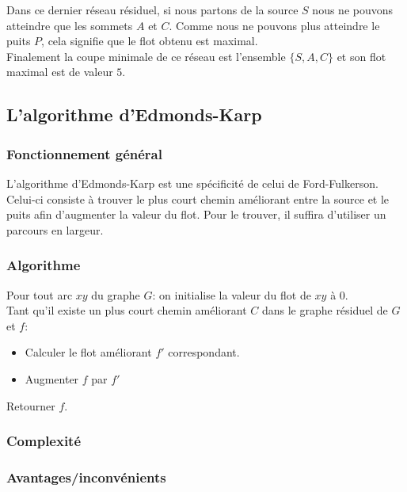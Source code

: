 \documentclass[a4paper]{article}
\begin{document}
Dans ce dernier réseau résiduel, si nous partons de la source $S$ nous ne pouvons atteindre que les sommets $A$ et $C$. Comme nous ne pouvons plus atteindre le puits $P$, cela signifie que le flot obtenu est maximal.\\
Finalement la coupe minimale de ce réseau est l'ensemble $\{S,A,C\}$ et son flot maximal est de valeur $5$.\\

\subsection{L'algorithme d'Edmonds-Karp}

\subsubsection{Fonctionnement général}
L'algorithme d'Edmonds-Karp est une spécificité de celui de Ford-Fulkerson. Celui-ci consiste à trouver le plus court chemin améliorant entre la source et le puits afin d'augmenter la valeur du flot. Pour le trouver, il suffira d'utiliser un parcours en largeur.\\

\subsubsection{Algorithme}
Pour tout arc $xy$ du graphe $G$: on initialise la valeur du flot de $xy$ à $0$.\\
Tant qu'il existe un plus court chemin améliorant $C$ dans le graphe résiduel de $G$ et $f$:
\begin{itemize}
	\item
    Calculer le flot améliorant $f'$ correspondant.
    \item 
    Augmenter $f$ par $f'$
\end{itemize}
Retourner $f$.\\

\subsubsection{Complexité}

\subsubsection{Avantages/inconvénients}
\end{document}
